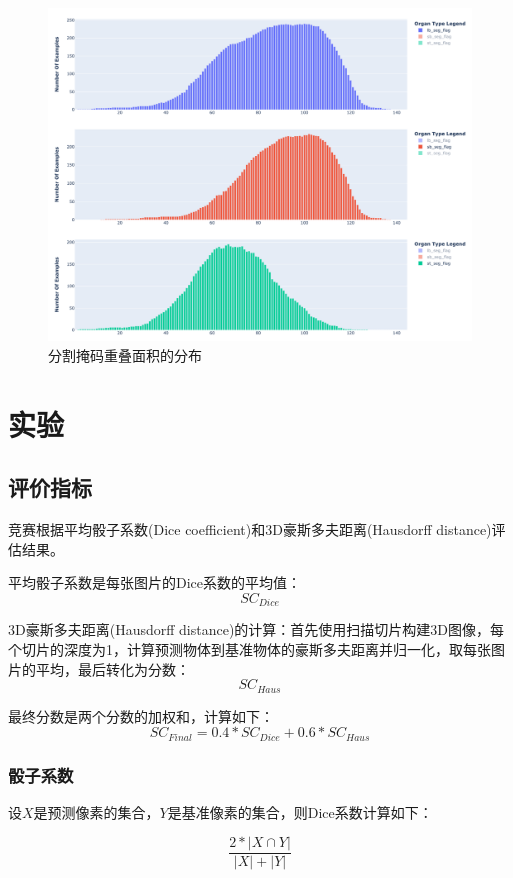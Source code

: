 \documentclass[letterpaper, 10pt, conference, twoside]{ieeeconf}
\begin{document}
\begin{figure}[htbp]
  \centering
  \includegraphics[width = 1\linewidth]{seg_distribution.png}
  \caption{分割掩码重叠面积的分布}
  \label{fig:fig6}
\end{figure}

\section{实验}
\subsection{评价指标}

竞赛根据平均骰子系数(Dice coefficient)和3D豪斯多夫距离(Hausdorff distance)评估结果。

平均骰子系数是每张图片的Dice系数的平均值：
\[SC_{Dice}\]

3D豪斯多夫距离(Hausdorff distance)的计算：首先使用扫描切片构建3D图像，每个切片的深度为1，计算预测物体到基准物体的豪斯多夫距离并归一化，取每张图片的平均，最后转化为分数：
\[ SC_{Haus} \]

最终分数是两个分数的加权和，计算如下：
\[SC_{Final} = 0.4 * SC_{Dice} + 0.6 * SC_{Haus}\]

\subsubsection{骰子系数}

设$X$是预测像素的集合，$Y$是基准像素的集合，则Dice系数计算如下：

\[ \frac{2*|X\cap Y|}{|X|+|Y|}\]
\end{document}
